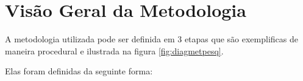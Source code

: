 

\section{Visão Geral da Metodologia}

A metodologia utilizada pode ser definida em 3 etapas que são exemplificas de maneira procedural e ilustrada na figura \ref{fig:diagmetpesq}.

Elas foram definidas da seguinte forma:

